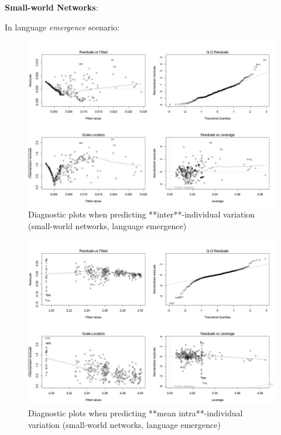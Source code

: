 \documentclass[
]{article}
\begin{document}
\textbf{Small-world Networks}:

In language \emph{emergence} scenario:

\begin{figure}[!H]

{\centering \includegraphics{./Figures/unnamed-chunk-134-1} 

}

\caption{Diagnostic plots when predicting **inter**-individual variation (small-world networks, language emergence)}\label{fig:unnamed-chunk-134}
\end{figure}

\begin{figure}[!H]

{\centering \includegraphics{./Figures/unnamed-chunk-135-1} 

}

\caption{Diagnostic plots when predicting **mean intra**-individual variation (small-world networks, language emergence)}\label{fig:unnamed-chunk-135}
\end{figure}
\end{document}
